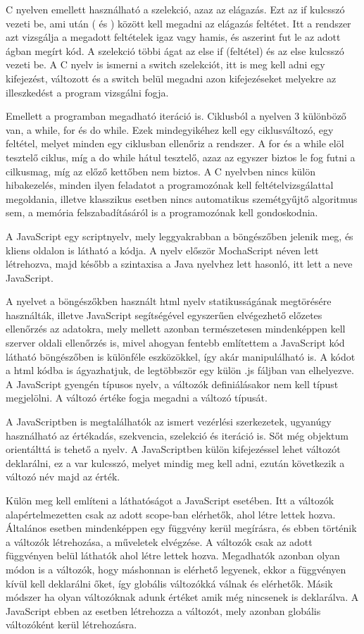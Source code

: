 C nyelven emellett használható a szelekció, azaz az elágazás. Ezt az if kulcsszó vezeti be, ami után ( és ) között kell megadni az elágazás feltétet. Itt a rendszer azt vizsgálja a megadott feltételek igaz vagy hamis, és aszerint fut le az adott ágban megírt kód. A szelekció többi ágat az else if (feltétel) és az else kulcsszó vezeti be. A C nyelv is ismerni a switch szelekciót, itt is meg kell adni egy kifejezést, változott és a switch belül megadni azon kifejezéseket melyekre az illeszkedést a program vizsgálni fogja.

Emellett a programban megadható iteráció is. Ciklusból a nyelven 3 különböző van, a while, for és do while. Ezek mindegyikéhez kell egy ciklusváltozó, egy feltétel, melyet minden egy ciklusban ellenőriz a rendszer. A for és a while elöl tesztelő ciklus, míg a do while hátul tesztelő, azaz az egyszer biztos le fog futni a cilkusmag, míg az előző kettőben nem biztos. A C nyelvben nincs külön hibakezelés, minden ilyen feladatot a programozónak kell feltételvizsgálattal megoldania, illetve klasszikus esetben nincs automatikus szemétgyűjtő algoritmus sem, a memória felszabadításáról is a programozónak kell gondoskodnia.

A JavaScript egy scriptnyelv, mely leggyakrabban a böngészőben jelenik meg, és kliens oldalon is látható a kódja. A nyelv először MochaScript néven lett létrehozva, majd később a szintaxisa a Java nyelvhez lett hasonló, itt lett a neve JavaScript.

A nyelvet a böngészőkben használt html nyelv statikusságának megtörésére használták, illetve JavaScript segítségével egyszerűen elvégezhető előzetes ellenőrzés az adatokra, mely mellett azonban természetesen mindenképpen kell szerver oldali ellenőrzés is, mivel ahogyan fentebb említettem a JavaScript kód látható böngészőben is különféle eszközökkel, így akár manipulálható is. A kódot a html kódba is ágyazhatjuk, de legtöbbször egy külön .js fáljban van elhelyezve. A JavaScript gyengén típusos nyelv, a változók definiálásakor nem kell típust megjelölni. A változó értéke fogja megadni a változó típusát.

A JavaScriptben is megtalálhatók az ismert vezérlési szerkezetek, ugyanúgy használható az értékadás, szekvencia, szelekció és iteráció is. Sőt még objektum orientálttá is tehető a nyelv. A JavaScriptben külön kifejezéssel lehet változót deklarálni, ez a var kulcsszó, melyet mindig meg kell adni, ezután következik a változó név majd az érték.

Külön meg kell említeni a láthatóságot a JavaScript esetében. Itt a változók alapértelmezetten csak az adott scope-ban elérhetők, ahol létre lettek hozva. Általános esetben mindenképpen egy függvény kerül megírásra, és ebben történik a változók létrehozása, a műveletek elvégzése. A változók csak az adott függvényen belül láthatók ahol létre lettek hozva. Megadhatók azonban olyan módon is a változók, hogy máshonnan is elérhető legyenek, ekkor a függvényen kívül kell deklarálni őket, így globális változókká válnak és elérhetők. Másik módszer ha olyan változóknak adunk értéket amik még nincsenek is deklarálva. A JavaScript ebben az esetben létrehozza a változót, mely azonban globális változóként kerül létrehozásra.

